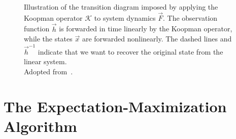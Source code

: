 	\begin{figure}
		\centering
		\tikzKoopmanOperator
		\caption[State transition model of a Koopman dynamical system]{Illustration of the transition diagram imposed by applying the Koopman operator \( \mathcal{K} \) to system dynamics \( \vec{F} \). The observation function \( \vec{h} \) is forwarded in time linearly by the Koopman operator, while the states \(\vec{x}\) are forwarded nonlinearly. The dashed lines and \( \vec{h}^{-1} \) indicate that we want to recover the original state from the linear system. \\ Adopted from~\cite{bruntonKoopmanInvariantSubspaces2016}.}
		\label{fig:koopman}
	\end{figure}

\section{The Expectation-Maximization Algorithm}
	\label{sec:em}

